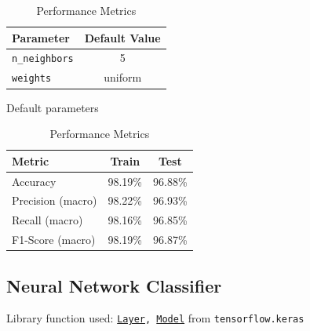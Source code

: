 \begin{table}[h!]
  \begin{minipage}{.5\linewidth}
    \centering
    \begin{tabular}{|l|c|}
      \hline
      \textbf{Parameter} & \textbf{Default Value} \\
      \hline
      \texttt{n\_neighbors} & 5 \\
      \texttt{weights} & uniform \\
      \hline
    \end{tabular}
    \caption{Default parameters}
  \end{minipage}%
  \begin{minipage}{.5\linewidth}
    \centering
    \begin{tabular}{|l|c|c|}
      \hline
      \textbf{Metric} & \textbf{Train} & \textbf{Test} \\
      \hline
      Accuracy & 98.19\% & 96.88\% \\
      Precision (macro) & 98.22\% & 96.93\% \\
      Recall (macro) & 98.16\% & 96.85\% \\
      F1-Score (macro) & 98.19\% & 96.87\% \\
      \hline
    \end{tabular}
    \caption{Performance Metrics}
  \end{minipage}
\end{table}

\newpage
\subsection{Neural Network Classifier}
Library function used: \texttt{\href{https://www.tensorflow.org/api_docs/python/tf/keras/Layer}{Layer}, \href{https://www.tensorflow.org/api_docs/python/tf/keras/Model}{Model}} from \texttt{tensorflow.keras}

